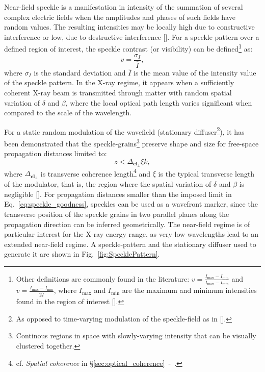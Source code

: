 \begin{refsection}
Near-field speckle is a manifestation in intensity of the summation of several complex electric fields when the amplitudes and phases of such fields have random values. The resulting intensities may be locally high due to constructive interference or low, due to destructive interference [\cite[\textit{\S1}]{Goodman2020}]. For a speckle pattern over a defined region of interest, the speckle contrast (or visibility) can be defined\footnote{Other definitions are commonly found in the literature: $v=\frac{I_\text{max}-I_\text{min}}{I_\text{max}-I_\text{min}}$ and $v=\frac{I_\text{max}-I_\text{min}}{2\overline{I}}$, where $I_\text{max}$ and $I_\text{min}$ are the maximum and minimum intensities found in the region of interest [\cite{Zdora2018a}].} as:
\begin{equation}\label{eq:visibility}
    v=\frac{\sigma_I}{\overline{I}},
\end{equation}
where $\sigma_I$ is the standard deviation and $\overline{I}$ is the mean value of the intensity value of the speckle pattern. In the X-ray regime, it appears when a sufficiently coherent X-ray beam is transmitted through matter with random spatial variation of $\delta$ and $\beta$, where the local optical path length varies significant when compared to the scale of the wavelength.

For a static random modulation of the wavefield (stationary diffuser\footnote{As opposed to time-varying modulation of the speckle-field as in [\cite{Morgan2010,Goikhman2015}].}), it has been demonstrated that the speckle-grains\footnote{Continous regions in space with slowly-varying intensity that can be visually clustered together.} preserve shape and size for free-space propagation distances limited to:
\begin{equation}\label{eq:speckle_goodness}
z<\Delta_{\textbf{cl}_\perp}\xi k,
\end{equation}
where $\Delta_{\textbf{cl}_\perp}$ is transverse coherence length\footnote{cf. \textit{Spatial coherence} in \S\ref{sec:optical_coherence}~-~\textit{}.} and $\xi$ is the typical transverse length of the modulator, that is, the region where the spatial variation of $\delta$ and $\beta$ is negligible [\cite{Cerbino2008}]. For propagation distances smaller than the imposed limit in Eq.~\ref{eq:speckle_goodness}, speckles can be used as a wavefront marker, since the transverse position of the speckle grains in two parallel planes along the propagation direction can be inferred geometrically. The near-field regime is of particular interest for the X-ray energy range, as very low wavelengths lead to an extended near-field regime. A speckle-pattern and the stationary diffuser used to generate it are shown in Fig.~\ref{fig:SpecklePattern}.


\end{refsection}
